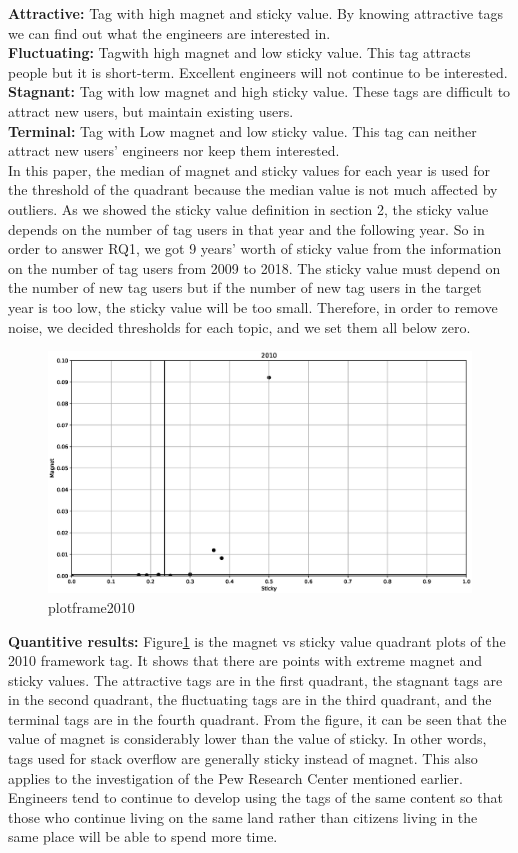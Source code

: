 \documentclass[conference]{IEEEtran}
\begin{document}
\smallskip
\textbf{Attractive:} Tag with high magnet and sticky value. By knowing attractive tags we can find out what the engineers are interested in.\\
\textbf{Fluctuating:} Tagwith high magnet and low sticky value. This tag attracts people but it is short-term. Excellent engineers will not continue to be interested.\\
\textbf{Stagnant:} Tag with low magnet and high sticky value. These tags are difficult to attract new users, but maintain existing users.\\
\textbf{Terminal:} Tag with Low magnet and low sticky value. This tag can neither attract new users' engineers nor keep them interested.\\
\smallskip
In this paper, the median of magnet and sticky values for each year is used for the threshold of the quadrant because the median value is not much affected by outliers. As we showed the sticky value definition in section 2, the sticky value depends on the number of tag users in that year and the following year. So in order to answer RQ1, we got 9 years' worth of sticky value from the information on the number of tag users from 2009 to 2018. The sticky value must depend on the number of new tag users but if the number of new tag users in the target year is too low, the sticky value will be too small. Therefore, in order to remove noise, we decided thresholds for each topic, and we set them all below zero. 
\medskip

\begin{figure}[t]
 \centering
 \includegraphics[width=.9\hsize]{img/plot_frame_2010.eps}  
 \caption{plotframe2010} 
 \label{fig:plotframe2010} 
\end{figure}

\textbf{Quantitive results:}
Figure\ref{fig:plotframe2010} is the magnet vs sticky value quadrant plots of the 2010 framework tag. It shows that there are points with extreme magnet and sticky values. The attractive tags are in the first quadrant, the stagnant tags are in the second quadrant, the fluctuating tags are in the third quadrant, and the terminal tags are in the fourth quadrant. From the figure, it can be seen that the value of magnet is considerably lower than the value of sticky. In other words, tags used for stack overflow are generally sticky instead of magnet. This also applies to the investigation of the Pew Research Center mentioned earlier. Engineers tend to continue to develop using the tags of the same content so that those who continue living on the same land rather than citizens living in the same place will be able to spend more time. 
\end{document}

